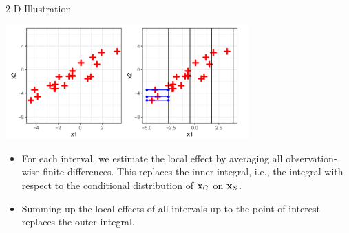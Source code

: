 \begin{vbframe}{2-D Illustration}
\framebreak


\begin{center}
\includegraphics[width=0.7\textwidth]{figure_man/2D01.png}
\end{center}


 \begin{itemize}
  \item For each interval, we estimate the local effect by averaging all observation-wise finite differences. This replaces the inner integral, i.e., the integral with respect to the conditional distribution of $\xv_C$ on $\xv_S$.
  \item Summing up the local effects of all intervals up to the point of interest replaces the outer integral.
\end{itemize}

\end{vbframe}



